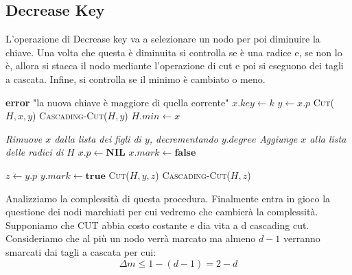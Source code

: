 \subsection{Decrease Key}
L'operazione di Decrease key va a selezionare un nodo per poi diminuire la chiave. Una volta che questa è diminuita si controlla se è una radice e, se non lo è, allora si stacca il nodo mediante l'operazione di cut e poi si eseguono dei tagli a cascata. Infine, si controlla se il minimo è cambiato o meno.
\begin{algorithm}[H]
\caption{FIB-HEAP-DECREASE-KEY($H, x, k$)}
\begin{algorithmic}[1]
        \State \textbf{error} "la nuova chiave è maggiore di quella corrente"
    \EndIf
    \State $x.key \gets k$
    \State $y \gets x.p$
        \State \textsc{Cut}($H, x, y$) 
        \State \textsc{Cascading-Cut}($H, y$) 
    \EndIf
        \State $H.min \gets x$ 
    \EndIf
\end{algorithmic}
\end{algorithm}
\begin{algorithm}[H]
\caption{CUT($H, x, y$)}
\begin{algorithmic}[1]
    \State \textit{Rimuove $x$ dalla lista dei figli di $y$, decrementando $y.degree$}
    \State \textit{Aggiunge $x$ alla lista delle radici di $H$}
    \State $x.p \gets \textbf{NIL}$
    \State $x.mark \gets \textbf{false}$
\end{algorithmic}
\end{algorithm}
\begin{algorithm}[H]
\caption{CASCADING-CUT($H, y$)}
\begin{algorithmic}[1]
    \State $z \gets y.p$
            \State $y.mark \gets \textbf{true}$
        \Else
            \State \textsc{Cut}($H, y, z$)
            \State \textsc{Cascading-Cut}($H, z$)
        \EndIf
    \EndIf
\end{algorithmic}
\end{algorithm}
Analizziamo la complessità di questa procedura. Finalmente entra in gioco la questione dei nodi marchiati per cui vedremo che cambierà la complessità. Supponiamo che CUT abbia costo costante e dia vita a d cascading cut. Consideriamo che al più un nodo verrà marcato ma almeno $d-1$ verranno smarcati dai tagli a cascata per cui:\[\Delta m \leq 1 - (d-1)=2-d\] 

